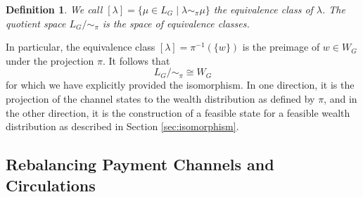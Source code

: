 \documentclass[10pt,twocolumn]{article}
\newtheorem{definition}{Definition}[section]
\begin{document}
\begin{definition}
We call \( [\lambda] = \{\mu \in L_G \mid \lambda \sim_{\pi} \mu\} \) the equivalence class of \( \lambda \).  
The quotient space \( L_G / \sim_{\pi} \) is the space of equivalence classes.
\end{definition}

In particular, the equivalence class \( [\lambda] = \pi^{-1}(\{w\}) \) is the preimage of \( w \in W_G \) under the projection \( \pi \).  
It follows that
\begin{equation}
  L_G / \sim_{\pi} \cong W_G
\end{equation}
for which we have explicitly provided the isomorphism.  
In one direction, it is the projection of the channel states to the wealth distribution as defined by \( \pi \), and in the other direction, it is the construction of a feasible state for a feasible wealth distribution as described in Section \ref{sec:isomorphism}.




\subsection{Rebalancing Payment Channels and Circulations}
\label{sec:rebalancing}

\end{document}
